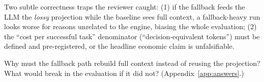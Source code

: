 \begin{whyhere}
Two subtle correctness traps the reviewer caught: (1) if the fallback feeds the LLM the
\emph{lossy} projection while the baseline sees full context, a fallback-heavy run looks
worse for reasons unrelated to the engine, biasing the whole evaluation; (2) the ``cost per
successful task'' denominator (``decision-equivalent tokens'') must be defined and
pre-registered, or the headline economic claim is unfalsifiable.
\end{whyhere}

\begin{checkbox}
Why must the fallback path rebuild full context instead of reusing the projection? What would
break in the evaluation if it did not? (Appendix~\ref{app:answers}.)
\end{checkbox}
